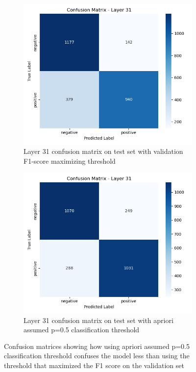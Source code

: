\documentclass{article}
\begin{document}
\begin{figure}[h!]
    \centering
    \begin{subfigure}[b]{0.48\linewidth}
        \centering
        \includegraphics[width=0.8\linewidth]{tex/finalreport230/variance_confusion_matrix_layer_31_f1_max_threshold.png}
        \caption{Layer 31 confusion matrix on test set with validation F1-score maximizing threshold}
        \label{fig:cm_f1}
    \end{subfigure}
    \hfill
    \begin{subfigure}[b]{0.48\linewidth}
        \centering
        \includegraphics[width=0.8\linewidth]{tex/finalreport230/confusion_matrix_layer_31_apriori_threshold.png}
        \caption{Layer 31 confusion matrix on test set with apriori assumed p=0.5 classification threshold}
        \label{fig:cm_apriori}
    \end{subfigure}
    \caption{Confusion matrices showing how using apriori assumed p=0.5 classification threshold confuses the model less than using the threshold that maximized the F1 score on the validation set}
    \label{fig:confusion_matrices}
\end{figure}
\end{document}
